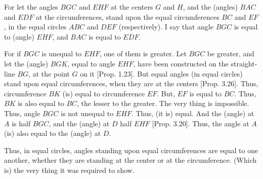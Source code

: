 \begin{Parallel}{}{}
{For let the angles $BGC$ and $EHF$ at the centers $G$ and $H$, and the (angles) $BAC$ and $EDF$
at the circumferences, stand upon the equal circumferences $BC$ and $EF$, in the equal circles $ABC$ and $DEF$ (respectively). I say that angle $BGC$ is
equal to (angle) $EHF$, and $BAC$ is equal to $EDF$.

For if $BGC$ is unequal to $EHF$, one of them is greater. Let $BGC$ be greater, 
and let the (angle) $BGK$, equal to  angle $EHF$, have been constructed on the
straight-line $BG$, at the point $G$ on it [Prop. 1.23]. But equal angles (in equal circles) stand upon equal circumferences, when they are at the centers [Prop. 3.26]. Thus,
circumference $BK$ (is) equal to circumference $EF$. But, $EF$ is equal to $BC$.
Thus, $BK$ is also equal to $BC$, the lesser to the greater. The very thing is
impossible. Thus, angle $BGC$ is not unequal to $EHF$. Thus, (it is) equal.
And the (angle) at $A$ is half $BGC$, and the (angle) at $D$ half $EHF$ [Prop. 3.20]. Thus, the angle at $A$ (is) also equal to the (angle) at $D$.

Thus, in equal circles, angles standing upon equal circumferences  are equal to one
another, whether they are standing at the center or at the circumference.
(Which is) the very thing it was required to show.}
\end{Parallel}


